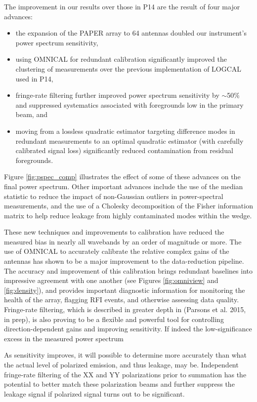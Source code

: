 \documentclass[twocolumn,numberedappendix]{emulateapj} \shorttitle{New Limits on the 21 cm Power Spectrum at $z=8.4$}
\newcommand{\parsonscitep}{(Parsons et al. 2015, in prep)}
\begin{document}
The improvement in our results over those in P14 are the result of four
major advances:
\begin{itemize}
\item the expansion of the PAPER array to 64 antennas doubled our instrument's power spectrum sensitivity,
\item using OMNICAL for redundant calibration significantly improved the clustering of measurements
over the previous implementation of LOGCAL used in P14,
\item fringe-rate filtering further improved power spectrum sensitivity by $\sim$50\% and suppressed
systematics associated with foregrounds low in the primary beam, and
\item moving from a lossless quadratic estimator targeting difference modes
in redundant measurements to an optimal quadratic estimator (with carefully calibrated signal
loss) significantly reduced contamination from residual foregrounds.
\end{itemize}
Figure \ref{fig:pspec_comp} illustrates the effect of some of these advances on the final
power spectrum.
Other important advances include the use of the median statistic to reduce the impact
of non-Gaussian outliers in power-spectral measurements, and the use of a Cholesky
decomposition of the Fisher information matrix to help reduce leakage 
from highly contaminated modes within the wedge.

These new techniques and improvements to calibration have reduced the measured
bias in nearly all wavebands by an order of magnitude or more. 
The use of
OMNICAL to accurately calibrate the relative complex gains of the antennas has
shown to be a major improvement to the data-reduction pipeline. The accuracy and improvement of
this calibration brings redundant baselines into impressive agreement with one another
(see Figures \ref{fig:omniview} and \ref{fig:density}),
and provides important diagnostic information for
monitoring the health of the
array, flagging RFI events, and otherwise assessing data quality.
Fringe-rate filtering, which is described in greater depth in \parsonscitep, is also
proving to be a flexible and powerful tool for controlling direction-dependent gains and
improving sensitivity.  If indeed the low-significance excess in the measured power spectrum

As sensitivity improves, it will possible to determine more accurately than
\citet{moore_et_al2015} what the actual level of polarized emission, and thus
leakage, may be.  Independent fringe-rate filtering of the XX and YY
polarizations prior to summation has the potential to better match these
polarization beams and further suppress the leakage signal if polarized signal
turns out to be significant.
\end{document}
